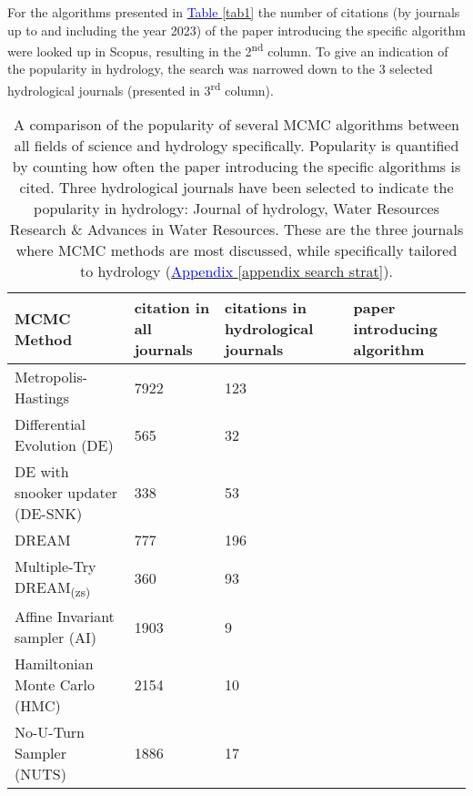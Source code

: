 For the algorithms presented in \hyperref[tab1]{\textcolor{blue}{Table }\ref{tab1}} the number of citations (by journals up to and including the year 2023) of the paper introducing the specific algorithm were looked up in Scopus, resulting in the 2\textsuperscript{nd} column. To give an indication of the popularity in hydrology, the search was narrowed down to the 3 selected hydrological journals (presented in 3\textsuperscript{rd} column). 
\begin{table*}[htb]
\caption{A comparison of the popularity of several MCMC algorithms between all fields of science and hydrology specifically. Popularity is quantified by counting how often the paper introducing the specific algorithms is cited. Three hydrological journals have been selected to indicate the popularity in hydrology: Journal of hydrology, Water Resources Research \& Advances in Water Resources.  These are the three journals where MCMC methods are most discussed, while  specifically tailored to hydrology (\hyperref[appendix search strat]{\textcolor{blue}{Appendix }\ref{appendix search strat}}).}

\label{tab1_copy}
\begin{tabularx}{\textwidth}{lXXl} 
    \toprule
    MCMC Method & citation in all journals & citations in hydrological journals & paper introducing algorithm\\
    \midrule
    Metropolis-Hastings & 7922 & 123 & \cite{hastings1970monte}\\
    Differential Evolution (DE) & 565 & 32 & \cite{terbraak2006markov}\\
    DE with snooker updater (DE-SNK) & 338 & 53 & \cite{terbraak2008differential}\\
    DREAM & 777 & 196 & \cite{vrugt2009accelerating}\\
    Multiple-Try DREAM\textsubscript{(zs)} & 360 & 93\phantom{0} & \cite{laloy2012high}\\
    Affine Invariant sampler (AI) & 1903 & 9\phantom{0}\phantom{0} & \cite{goodman2010ensemble} \\
    Hamiltonian Monte Carlo (HMC) & 2154 & 10\phantom{0} & \cite{duane1987hybrid}\\
    No-U-Turn Sampler (NUTS) & 1886 & 17\phantom{0} & \cite{hoffman2014no}\\ 
    \bottomrule
\end{tabularx}
\end{table*}